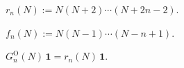 \begin{definition}\label{def:even_rising}
\leanok
$r_n(N) := N(N+2)\cdots(N+2n-2)$.
\end{definition}

\begin{definition}\label{def:falling_fact}
\leanok
$f_n(N) := N(N-1)\cdots(N-n+1)$.
\end{definition}

\begin{theorem}\label{thm:orth_ones_absorb}
\leanok
{}
$G^{\mathrm O}_n(N)\,\mathbf 1 = r_n(N)\,\mathbf 1$.
\end{theorem}

